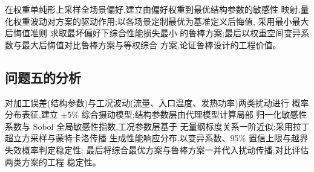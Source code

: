 在权重单纯形上采样全场景偏好,建立由偏好权重到最优结构参数的敏感性
映射,量化权重波动对方案的驱动作用;以各场景定制最优为基准定义后悔值,
采用最小最大后悔值准则\cite{Savage1951} 求取最坏偏好下综合性能损失最小
的鲁棒方案;最后以权重空间变异系数与最大后悔值对比鲁棒方案与等权综合
方案,论证鲁棒设计的工程价值。

\subsection{问题五的分析}

对加工误差(结构参数)与工况波动(流量、入口温度、发热功率)两类扰动进行
概率分布表征,建立 $\pm5\%$ 综合摄动模型;结构参数层由代理模型计算局部
归一化敏感性系数与 Sobol 全局敏感性指数\cite{Sobol2001},工况参数层基于
无量纲标度关系一阶近似;采用拉丁超立方采样与蒙特卡洛传播\cite{McKay1979}
生成性能响应分布,以变异系数、95\% 置信上限与越界失效概率判定稳定性;
最后将综合最优方案与鲁棒方案一并代入扰动传播,对比评估两类方案的工程
稳定性。
